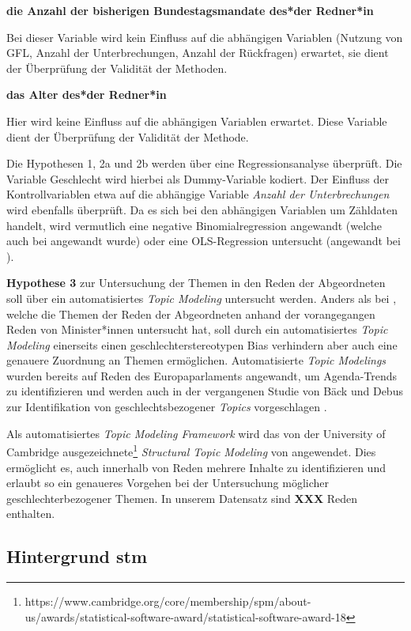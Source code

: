 \documentclass[12pt, 
    twoside=false, 
    bibliography=totoc, 
    numbers=endperiod, 
    headings=normal, 
    toc=chapterentrydotfill
    ]{scrbook}
\begin{document}
\textbf{die Anzahl der bisherigen Bundestagsmandate des*der Redner*in}

Bei dieser Variable wird kein Einfluss auf die abhängigen Variablen (Nutzung von GFL, Anzahl der Unterbrechungen, Anzahl der Rückfragen) erwartet, sie dient der Überprüfung der Validität der Methoden.

\textbf{das Alter des*der Redner*in}

Hier wird keine Einfluss auf die abhängigen Variablen erwartet. Diese Variable dient der Überprüfung der Validität der Methode.

Die {Hypothesen 1, 2a und 2b} werden über eine Regressionsanalyse überprüft. Die Variable Geschlecht wird hierbei als Dummy-Variable kodiert. Der Einfluss der Kontrollvariablen etwa auf die abhängige Variable \emph{Anzahl der Unterbrechungen} wird ebenfalls überprüft. Da es sich bei den abhängigen Variablen um Zähldaten handelt, wird vermutlich eine negative Binomialregression angewandt (welche auch bei \textcite{back_2014} angewandt wurde) oder eine OLS-Regression untersucht (angewandt bei \textcite{coffe_2013}).


\textbf{Hypothese 3} zur Untersuchung der Themen in den Reden der Abgeordneten soll über ein automatisiertes \emph{Topic Modeling} untersucht werden. Anders als bei \textcite{back_2014}, welche die Themen der Reden der Abgeordneten anhand der vorangegangen Reden von Minister*innen untersucht hat, soll durch ein automatisiertes \emph{Topic Modeling} einerseits einen geschlechterstereotypen Bias verhindern aber auch eine genauere Zuordnung an Themen ermöglichen. 
Automatisierte \emph{Topic Modelings} wurden bereits auf Reden des Europaparlaments angewandt, um Agenda-Trends zu identifizieren \parencite[vgl.][]{greene_2016} und werden auch in der vergangenen Studie von Bäck und Debus zur Identifikation von geschlechtsbezogener \emph{Topics} vorgeschlagen \parencite*[18]{back_2018}.

Als automatisiertes \emph{Topic Modeling Framework} wird das von der University of Cambridge ausgezeichnete\footnote{https://www.cambridge.org/core/membership/spm/about-us/awards/statistical-software-award/statistical-software-award-18} \emph{Structural Topic Modeling} von \textcite{roberts_2018} angewendet. Dies ermöglicht es, auch innerhalb von Reden mehrere Inhalte zu identifizieren und erlaubt so ein genaueres Vorgehen bei der Untersuchung möglicher geschlechterbezogener Themen. In unserem Datensatz sind \textbf{XXX} Reden enthalten.

\subsection{Hintergrund stm}
\end{document}
